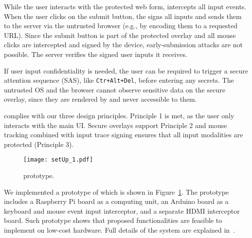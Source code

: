 While the user interacts with the protected web form, \hub intercepts all input events. When the user clicks on the submit button, the \hub signs all inputs and sends them to the server via the untrusted browser (e.g., by encoding them to a requested URL). Since the submit button is part of the protected overlay and all mouse clicks are intercepted and signed by the \hub device, early-submission attacks are not possible. The server verifies the signed user inputs it receives. 

If user input confidentiality is needed, the user can be required to trigger a secure attention sequence (SAS), like \texttt{Ctr+Alt+Del}, before entering any secrets. The untrusted OS and the browser cannot observe sensitive data on the secure overlay, since they are rendered by \hub and never accessible to them.

\protection complies with our three design principles. Principle 1 is met, as the user only interacts with the main UI. Secure overlays support Principle 2 and mouse tracking combined with input trace signing ensures that all input modalities are protected (Principle 3).

\begin{figure}[t]
	\centering
	\texttt{[image: setUp\_1.pdf]}
	\caption{\protection prototype.}
\label{fig:prototype}   
\end{figure}

We implemented a prototype of \protection which is shown in Figure~\ref{fig:prototype}. The prototype includes a Raspberry Pi board as a computing unit, an Arduino board as a keyboard and mouse event input interceptor, and a separate HDMI interceptor board. Such prototype shows that proposed functionalities are feasible to implement on low-cost hardware. Full details of the \protection system are explained in~\cite{protection}.

